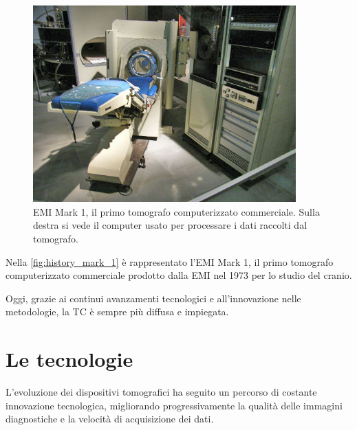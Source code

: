 \documentclass[12pt,a4paper]{report}
\begin{document}
\begin{figure}[H]
  \centering
  \includegraphics[width=0.9\textwidth]{scanner-Mark-I}
  \caption{\label{fig:history_mark_1} EMI Mark 1, il primo tomografo computerizzato commerciale.
           Sulla destra si vede il computer usato per processare i dati raccolti dal tomografo.}
\end{figure}

Nella \autoref{fig:history_mark_1} è rappresentato l'EMI Mark 1, il primo tomografo computerizzato commerciale prodotto dalla EMI
nel 1973 per lo studio del cranio.

Oggi, grazie ai continui avanzamenti tecnologici e all'innovazione nelle metodologie, la TC è sempre più diffusa e impiegata.

\section{Le tecnologie}

L'evoluzione dei dispositivi tomografici ha seguito un percorso di costante innovazione tecnologica, migliorando progressivamente
la qualità delle immagini diagnostiche e la velocità di acquisizione dei dati.
\end{document}
